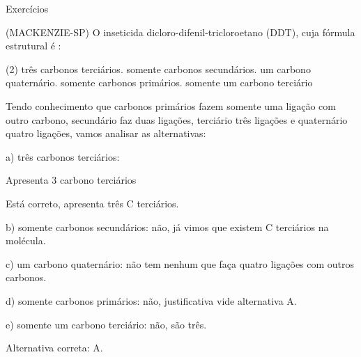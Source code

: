 \documentclass[presentation,professionalfonts,smaller,aspectratio=169]{beamer}
\begin{document}
\begin{frame}[allowframebreaks]{Exercícios}
\begin{question}
\alert{(MACKENZIE-SP)} O inseticida dicloro-difenil-tricloroetano (DDT), cuja fórmula estrutural é :



\begin{choice}(2)
\choice três carbonos terciários.
\choice somente carbonos secundários.
\choice um carbono quaternário.
\choice somente carbonos primários.
\choice somente um carbono terciário
\end{choice}
\end{question}
\pagebreak
\begin{answer}[print=true]
\small
Tendo conhecimento que carbonos primários fazem somente uma ligação com outro carbono, secundário faz duas ligações, terciário três ligações e quaternário quatro ligações, vamos analisar as alternativas:

a) três carbonos terciários:



Apresenta \alert{3 carbono terciários}

Está correto, apresenta três C terciários.

b) somente carbonos secundários: não, já vimos que existem C terciários na molécula.

c) um carbono quaternário: não tem nenhum que faça quatro ligações com outros carbonos.

d) somente carbonos primários: não, justificativa vide alternativa A.

e) somente um carbono terciário: não, são três.

Alternativa correta: \alert{A}.
\end{answer}
\end{frame}
\end{document}
